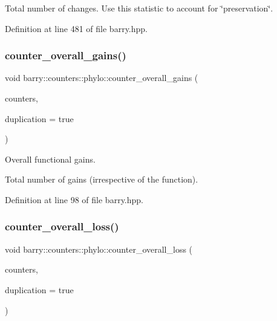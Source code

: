 Total number of changes. Use this statistic to account for \char`\"{}preservation\char`\"{}. 



Definition at line 481 of file barry.\+hpp.

\mbox{\label{namespacebarry_1_1counters_1_1phylo_ae1e599324d656660ce8730b77efcbcce}} 
\subsubsection{\texorpdfstring{counter\+\_\+overall\+\_\+gains()}{counter\_overall\_gains()}}
{\footnotesize\ttfamily void barry\+::counters\+::phylo\+::counter\+\_\+overall\+\_\+gains (\begin{DoxyParamCaption}\item[{\hyperlink{namespacebarry_1_1counters_1_1phylo_a4e401ffe66d04091343dcffaf915f8c3}{Phylo\+Counters} $\ast$}]{counters,  }\item[{bool}]{duplication = {\ttfamily true} }\end{DoxyParamCaption})\hspace{0.3cm}{\ttfamily [inline]}}



Overall functional gains. 

Total number of gains (irrespective of the function). 

Definition at line 98 of file barry.\+hpp.

\mbox{\label{namespacebarry_1_1counters_1_1phylo_a79ccde09af0d3d47b1a3162a16bc4597}} 
\subsubsection{\texorpdfstring{counter\+\_\+overall\+\_\+loss()}{counter\_overall\_loss()}}
{\footnotesize\ttfamily void barry\+::counters\+::phylo\+::counter\+\_\+overall\+\_\+loss (\begin{DoxyParamCaption}\item[{\hyperlink{namespacebarry_1_1counters_1_1phylo_a4e401ffe66d04091343dcffaf915f8c3}{Phylo\+Counters} $\ast$}]{counters,  }\item[{bool}]{duplication = {\ttfamily true} }\end{DoxyParamCaption})\hspace{0.3cm}{\ttfamily [inline]}}



